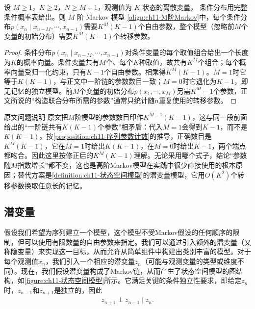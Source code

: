 \documentclass[../../main.tex]{subfiles}
\begin{document}
\begin{proposition}[$M$阶Markov模型的参数计数]\label{proposition:ch11-序列参数计数}
设 $M\geqslant1$，$K\geqslant2$，$N\geqslant M+1$，观测值为 $K$ 状态的离散变量，
条件分布用完整条件概率表给出。则 $M$ 阶 Markov 模型
\eqref{align:ch11-M阶Markov}中，每个条件分布$p(x_n\mid x_{n-M},\cdots,x_{n-1})$需要$K^{M}(K-1)$个自由参数，整个模型（忽略前$M$个变量的初始分布）需要$K^{M}(K-1)$个转移参数。
\end{proposition}

\begin{proof}
条件分布$p(x_n\mid x_{n-M},\cdots,x_{n-1})$对条件变量的每个取值组合给出一个长度为$K$的概率向量。条件变量共有$M$个、每个$K$种取值，故共有$K^{M}$个组合；每个概率向量受归一化约束，只有$K-1$个自由参数。相乘得$K^{M}(K-1)$。$M=1$时它等于$K(K-1)$，与正文中一阶链的参数数目一致；$M=0$时它退化为$K-1$，即无记忆的独立模型。前$M$个变量的初始分布$p(x_1,\cdots,x_M)$另需$K^{M}-1$个参数，正文所说的“构造联合分布所需的参数”通常只统计随$n$重复使用的转移参数。
\end{proof}

\begin{remark}原文问题说明
原文把$M$阶模型的参数数目印作$K^{M-1}(K-1)$，这与同一段前面给出的“一阶链共有$K(K-1)$个参数”相矛盾：代入$M=1$会得到$K-1$，而不是$K(K-1)$。按\cref{proposition:ch11-序列参数计数}的推导，正确数目是$K^{M}(K-1)$，它在$M=1$时给出$K(K-1)$，在$M=0$时给出$K-1$，两个端点都吻合。因此这里按修正后的$K^{M}(K-1)$理解。无论采用哪个式子，结论“参数随$M$指数增长”都不变，这也是高阶Markov模型在实践中很少直接使用的根本原因；替代方案是\cref{definition:ch11-状态空间模型}的潜变量模型，它用$O(K^2)$个转移参数换取任意长的记忆。
\end{remark}

\subsection*{潜变量}

假设我们希望为序列建立一个模型，这个模型不受Markov假设的任何顺序的限制，但可以使用有限数量的自由参数来指定。我们可以通过引入额外的潜变量（又称隐变量）来实现这一目标，从而允许从简单组件中构建出类别丰富的模型。对于每个观测值$x_n$，我们引入一个相应的潜变量$z_n$（可能与观测变量的类型或维度不同）。现在，我们假设潜变量构成了Markov链，从而产生了状态空间模型的图结构，如\cref{figure:ch11-状态空间模型}所示。它满足关键的条件独立性要求，即给定$z_n$时，$z_{n-1}$和$z_{n+1}$是独立的，因此
\begin{align}
  z_{n+1} \perp z_{n-1} \mid z_n.
  \label{align:ch11-状态空间条件独立}
\end{align}
\end{document}
